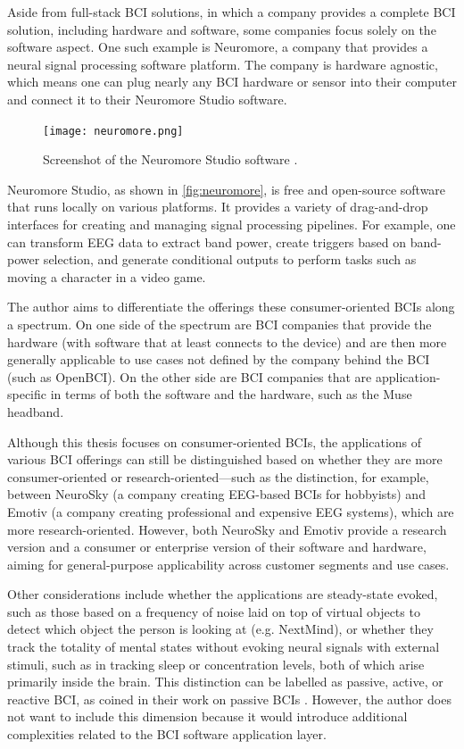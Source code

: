 Aside from full-stack BCI solutions, in which a company provides a complete BCI solution, including hardware and software, some companies focus solely on the software aspect. One such example is Neuromore, a company that provides a neural signal processing software platform. The company is hardware agnostic, which means one can plug nearly any BCI hardware or sensor into their computer and connect it to their Neuromore Studio software.

\begin{figure}[ht]
  \centering
  \texttt{[image: neuromore.png]}
  \caption[Screenshot of the Neuromore Studio software ]{Screenshot of the Neuromore Studio software \citep{neuromore_neuromore_nodate}.}
  \label{fig:neuromore}
\end{figure}

Neuromore Studio, as shown in \autoref{fig:neuromore}, is free and open-source software that runs locally on various platforms. It provides a variety of drag-and-drop interfaces for creating and managing signal processing pipelines. For example, one can transform EEG data to extract band power, create triggers based on band-power selection, and generate conditional outputs to perform tasks such as moving a character in a video game.

The author aims to differentiate the offerings these consumer-oriented BCIs along a spectrum. On one side of the spectrum are BCI companies that provide the hardware (with software that at least connects to the device) and are then more generally applicable to use cases not defined by the company behind the BCI (such as OpenBCI). On the other side are BCI companies that are application-specific in terms of both the software and the hardware, such as the Muse headband.

Although this thesis focuses on consumer-oriented BCIs, the applications of various BCI offerings can still be distinguished based on whether they are more consumer-oriented or research-oriented—such as the distinction, for example, between NeuroSky (a company creating EEG-based BCIs for hobbyists) and Emotiv (a company creating professional and expensive EEG systems), which are more research-oriented. However, both NeuroSky and Emotiv provide a research version and a consumer or enterprise version of their software and hardware, aiming for general-purpose applicability across customer segments and use cases.

Other considerations include whether the applications are steady-state evoked, such as those based on a frequency of noise laid on top of virtual objects to detect which object the person is looking at (e.g. NextMind), or whether they track the totality of mental states without evoking neural signals with external stimuli, such as in tracking sleep or concentration levels, both of which arise primarily inside the brain. This distinction can be labelled as passive, active, or reactive BCI, as \citeauthor{alimardani_passive_2020} coined in their work on passive BCIs \citep{alimardani_passive_2020}. However, the author does not want to include this dimension because it would introduce additional complexities related to the BCI software application layer.

